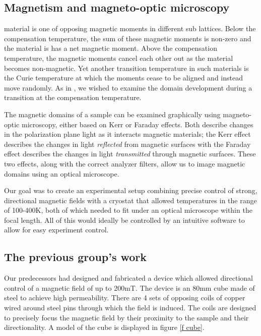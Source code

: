 \documentclass[journal,a4paper]{IEEEtran}
\begin{document}
\subsection{Magnetism and magneto-optic microscopy}
 material is one of opposing magnetic moments in different sub lattices. Below the compensation temperature, the sum of these magnetic moments is non-zero and the material is has a net magnetic moment. Above the compensation temperature, the magnetic moments cancel each other out as the material becomes non-magnetic. Yet another transition temperature in such materials is the Curie temperature at which the moments cease to be aligned and instead move randomly. As in \cite{garnet}, we wished to examine the domain development during a transition at the compensation temperature.

The magnetic domains of a sample can be examined graphically using magneto-optic microscopy, either based on Kerr or Faraday effects. Both describe changes in the polarization plane light as it interacts magnetic materials; the Kerr effect describes the changes in light \emph{reflected} from magnetic surfaces with the Faraday effect describes the changes in light \emph{transmitted} through magnetic surfaces. These two effects, along with the correct analyzer filters, allow us to image magnetic domains using an optical microscope.

Our goal was to create an experimental setup combining precise control of strong, directional magnetic fields with a cryostat that allowed temperatures in the range of 100-400K, both of which needed to fit under an optical microscope within the focal length. All of this would ideally be controlled by an intuitive software to allow for easy experiment control.

\subsection{The previous group's work}
Our predecessors had designed and fabricated a device which allowed directional control of a magnetic field of up to 200mT. The device is an 80mm cube made of steel to achieve high permeability. There are 4 sets of opposing coils of copper wired around steel pins through which the field is induced. The coils are designed to precisely focus the magnetic field by their proximity to the sample and their directionality. A model of the cube is displayed in figure \ref{f cube}.
\end{document}
